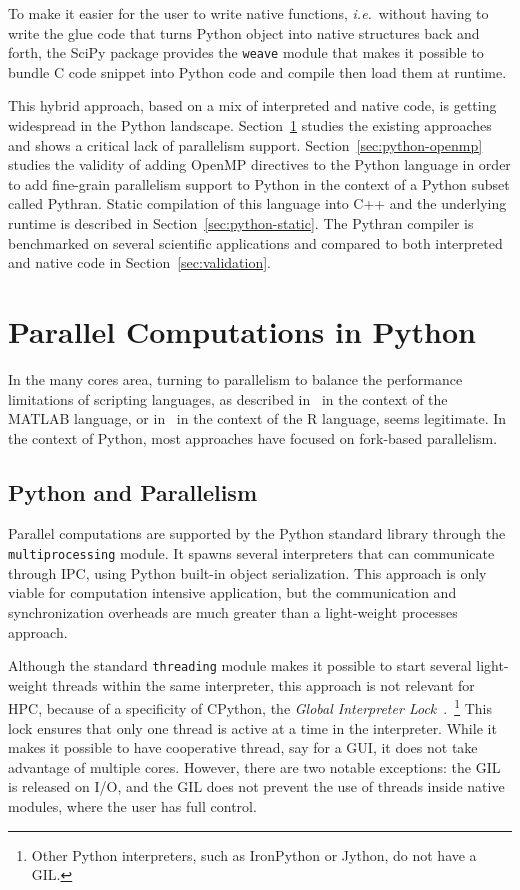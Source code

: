 \documentclass{llncs}
\begin{document}
To make it easier for the user to write native functions, \emph{i.e.}\ without
having to write the glue code that turns Python object into native structures
back and forth, the SciPy package provides the \texttt{weave} module that makes
it possible to bundle C code snippet into Python code and compile then load them
at runtime.

This hybrid approach, based on a mix of interpreted and native code, is getting
widespread in the Python landscape. Section~\ref{sec:python-parallel} studies
the existing approaches and shows a critical lack of parallelism support.
Section~\ref{sec:python-openmp} studies the validity of adding OpenMP directives
to the Python language in order to add fine-grain parallelism support to Python
in the context of a Python subset called Pythran. Static compilation of this
language into C++ and the underlying runtime is described in
Section~\ref{sec:python-static}. The Pythran compiler is benchmarked on several
scientific applications and compared to both interpreted and native code in
Section~\ref{sec:validation}.

\section{Parallel Computations in Python}\label{sec:python-parallel}

In the many cores area, turning to parallelism to balance the performance
limitations of scripting languages, as described in~\cite{choy05} in the context
of the MATLAB language, or in~\cite{mals07} in the context of the R language,
seems legitimate. In the context of Python, most approaches have
focused on fork-based parallelism.

\subsection{Python and Parallelism}

Parallel computations are supported by the Python standard library through the
\texttt{multiprocessing} module. It spawns several interpreters that can
communicate through IPC, using Python built-in object serialization. This
approach is only viable for computation intensive application, but the
communication and synchronization overheads are much greater than a light-weight
processes approach.

Although the standard \texttt{threading} module makes it possible to start
several light-weight threads within the same interpreter, this approach is not
relevant for HPC, because of a specificity of CPython, the \emph{Global
Interpreter Lock}~\cite{gil2012}.~\footnote{Other Python interpreters, such as
IronPython or Jython, do not have a GIL.} This lock ensures that only one thread
is active at a time in the interpreter. While it makes it possible to have
cooperative thread, say for a GUI, it does not take advantage of multiple cores.
However, there are two notable exceptions: the GIL is released on I/O, and the
GIL does not prevent the use of threads inside native modules, where the user
has full control.
\end{document}
